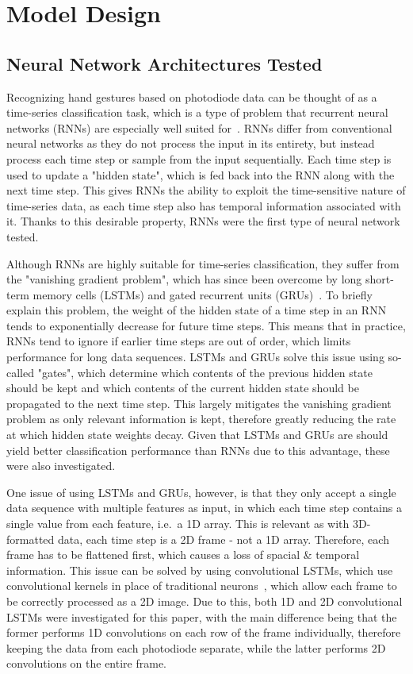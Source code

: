 \section{Model Design}\label{sec:model-design}
\subsection{Neural Network Architectures Tested}\label{subsec:architectures-tested}
Recognizing hand gestures based on photodiode data can be thought of as a time-series classification task, which is a type of problem that recurrent neural networks (RNNs) are especially well suited for~\cite{HUSKEN2003223}.
RNNs differ from conventional neural networks as they do not process the input in its entirety, but instead process each time step or sample from the input sequentially.
Each time step is used to update a "hidden state", which is fed back into the RNN along with the next time step.
This gives RNNs the ability to exploit the time-sensitive nature of time-series data, as each time step also has temporal information associated with it.
Thanks to this desirable property, RNNs were the first type of neural network tested.

Although RNNs are highly suitable for time-series classification, they suffer from the "vanishing gradient problem", which has since been overcome by long short-term memory cells (LSTMs) and gated recurrent units (GRUs)~\cite{DBLP:journals/corr/abs-1801-06105}.
To briefly explain this problem, the weight of the hidden state of a time step in an RNN tends to exponentially decrease for future time steps.
This means that in practice, RNNs tend to ignore if earlier time steps are out of order, which limits performance for long data sequences.
LSTMs and GRUs solve this issue using so-called "gates", which determine which contents of the previous hidden state should be kept and which contents of the current hidden state should be propagated to the next time step.
This largely mitigates the vanishing gradient problem as only relevant information is kept, therefore greatly reducing the rate at which hidden state weights decay.
Given that LSTMs and GRUs are should yield better classification performance than RNNs due to this advantage, these were also investigated.

One issue of using LSTMs and GRUs, however, is that they only accept a single data sequence with multiple features as input, in which each time step contains a single value from each feature, i.e.\ a 1D array.
This is relevant as with 3D-formatted data, each time step is a 2D frame - not a 1D array.
Therefore, each frame has to be flattened first, which causes a loss of spacial \& temporal information.
This issue can be solved by using convolutional LSTMs, which use convolutional kernels in place of traditional neurons~\cite{https://doi.org/10.48550/arxiv.1506.04214}, which allow each frame to be correctly processed as a 2D image.
Due to this, both 1D and 2D convolutional LSTMs were investigated for this paper, with the main difference being that the former performs 1D convolutions on each row of the frame individually, therefore keeping the data from each photodiode separate, while the latter performs 2D convolutions on the entire frame.

